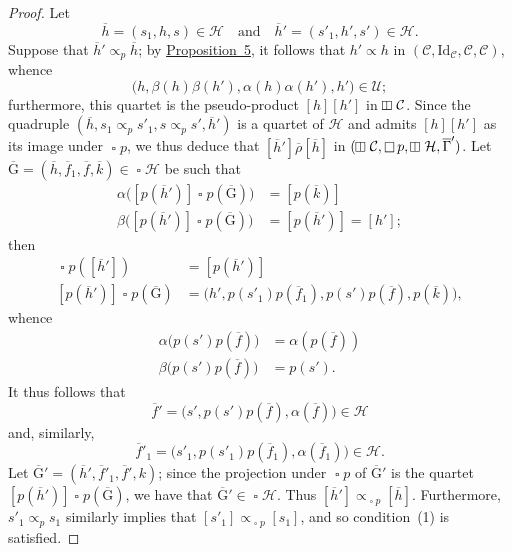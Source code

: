 \documentclass[a4paper,fleqn]{article}
\theoremstyle{plain}
\theoremstyle{definition}
\newcommand{\textand}{\quad\text{and}\quad}
\newcommand{\CC}{\mathcal{C}}
\newcommand{\HH}{\mathcal{H}}
\newcommand{\UU}{\mathcal{U}}
\newcommand{\relrhobar}{\mathrel{\overline{\rho}}}
\newcommand{\subs}{\mathrel{\propto}}
\newcommand{\Id}{\mathrm{Id}}
\newcommand{\vsqbox}{{\rotatebox{90}{$\boxminus$}}}
\DeclareMathOperator{\sq}{\square}
\DeclareMathOperator{\vsq}{\raisebox{-.1em}{$\vsqbox$\,}}
\begin{document}
\begin{proof}
  Let
  \[
    \overline{h}=(s_1,h,s)\in\HH
    \textand
    \overline{h}'=(s'_1,h',s')\in\HH.
  \]
  Suppose that $\overline{h}'\subs_p\overline{h}$;
  by \hyperref[proposition:i-5]{Proposition~5}, it follows that $h'\subs h$ in $(\CC,\Id_\CC,\CC,\CC)$, whence
  \[
    \big(h,\beta(h)\beta(h'),\alpha(h)\alpha(h'),h'\big)\in\UU;
  \]
  furthermore, this quartet is the pseudo-product $[h][h']$ in $\vsq\CC$.
  Since the quadruple $(\overline{h},s_1\subs_p s'_1,s\subs_p s',\overline{h}')$ is a quartet of $\HH$ and admits $[h][h']$ as its image under $\sq p$, we thus deduce that $[\overline{h}']\relrhobar[\overline{h}]$ in $(\vsq\CC,\sq p,\vsq\HH,\overline{\Gamma}')$.
  Let $\overline{\mathrm{G}}=(\overline{h},\overline{f}_1,\overline{f},\overline{k})\in\sq\HH$ be such that
  \[
    \begin{aligned}
      \alpha\big(
        [p(\overline{h}')]\sq p(\overline{\mathrm{G}})
        \big)
        &= [p(\overline{k})]
    \\\beta\big(
        [p(\overline{h}')]\sq p(\overline{\mathrm{G}})
        \big)
        &= [p(\overline{h}')]
        = [h'];
    \end{aligned}
  \]
  then
  \[
    \begin{aligned}
      \sq p([\overline{h}'])
      &= [p(\overline{h}')]
    \\{}[p(\overline{h}')]\sq p(\overline{\mathrm{G}})
      &= \big(
        h', p(s'_1)p(\overline{f}_1), p(s')p(\overline{f}), p(\overline{k})
      \big),
    \end{aligned}
  \]
  whence
  \[
    \begin{aligned}
      \alpha\big(p(s')p(\overline{f})\big)
      &= \alpha(p(\overline{f}))
    \\\beta\big(p(s')p(\overline{f})\big)
      &= p(s').
    \end{aligned}
  \]
  It thus follows that
  \[
    \overline{f}'
    = \big(
      s', p(s')p(\overline{f}), \alpha(\overline{f})
    \big)
    \in\HH
  \]
  and, similarly,
  \[
    \overline{f}'_1
    = \big(
      s'_1, p(s'_1)p(\overline{f}_1), \alpha(\overline{f}_1)
    \big)
    \in\HH.
  \]
  Let $\overline{\mathrm{G}}'=(\overline{h}',\overline{f}'_1,\overline{f}',k)$;
  since the projection under $\sq p$ of $\overline{\mathrm{G}}'$ is the quartet $[p(\overline{h}')]\sq p(\overline{\mathrm{G}})$, we have that $\overline{\mathrm{G}}'\in\sq\HH$.
  Thus $[\overline{h}']\subs_{\sq p}[\overline{h}]$.
  Furthermore, $s'_1\subs_p s_1$ similarly implies that $[s'_1]\subs_{\sq p}[s_1]$, and so condition~(1) is satisfied.


\end{proof}
\end{document}
